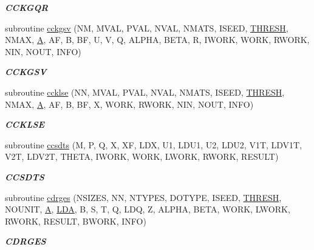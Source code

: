 \begin{DoxyCompactItemize}
\begin{DoxyCompactList}\small\item\em {\bfseries C\+C\+K\+G\+Q\+R} \end{DoxyCompactList}\item 
subroutine \hyperlink{group__complex__eig_gab332c713db9ff9a65c6b4ee66173021c}{cckgsv} (N\+M, M\+V\+A\+L, P\+V\+A\+L, N\+V\+A\+L, N\+M\+A\+T\+S, I\+S\+E\+E\+D, \hyperlink{zlaqgs_8c_a0656018abfc9fa2821827415f5d5ea57}{T\+H\+R\+E\+S\+H}, N\+M\+A\+X, \hyperlink{classA}{A}, A\+F, B, B\+F, U, V, Q, A\+L\+P\+H\+A, B\+E\+T\+A, R, I\+W\+O\+R\+K, W\+O\+R\+K, R\+W\+O\+R\+K, N\+I\+N, N\+O\+U\+T, I\+N\+F\+O)
\begin{DoxyCompactList}\small\item\em {\bfseries C\+C\+K\+G\+S\+V} \end{DoxyCompactList}\item 
subroutine \hyperlink{group__complex__eig_ga5b0a12a9548976fc736b24a730538084}{ccklse} (N\+N, M\+V\+A\+L, P\+V\+A\+L, N\+V\+A\+L, N\+M\+A\+T\+S, I\+S\+E\+E\+D, \hyperlink{zlaqgs_8c_a0656018abfc9fa2821827415f5d5ea57}{T\+H\+R\+E\+S\+H}, N\+M\+A\+X, \hyperlink{classA}{A}, A\+F, B, B\+F, X, W\+O\+R\+K, R\+W\+O\+R\+K, N\+I\+N, N\+O\+U\+T, I\+N\+F\+O)
\begin{DoxyCompactList}\small\item\em {\bfseries C\+C\+K\+L\+S\+E} \end{DoxyCompactList}\item 
subroutine \hyperlink{group__complex__eig_gafa5cdc631c988f7e170b0829ef5e1b08}{ccsdts} (M, P, Q, X, X\+F, L\+D\+X, U1, L\+D\+U1, U2, L\+D\+U2, V1\+T, L\+D\+V1\+T, V2\+T, L\+D\+V2\+T, T\+H\+E\+T\+A, I\+W\+O\+R\+K, W\+O\+R\+K, L\+W\+O\+R\+K, R\+W\+O\+R\+K, R\+E\+S\+U\+L\+T)
\begin{DoxyCompactList}\small\item\em {\bfseries C\+C\+S\+D\+T\+S} \end{DoxyCompactList}\item 
subroutine \hyperlink{group__complex__eig_ga9768e84ddc8b8b97e11717e35c5269fe}{cdrges} (N\+S\+I\+Z\+E\+S, N\+N, N\+T\+Y\+P\+E\+S, D\+O\+T\+Y\+P\+E, I\+S\+E\+E\+D, \hyperlink{zlaqgs_8c_a0656018abfc9fa2821827415f5d5ea57}{T\+H\+R\+E\+S\+H}, N\+O\+U\+N\+I\+T, \hyperlink{classA}{A}, \hyperlink{example__user_8c_ae946da542ce0db94dced19b2ecefd1aa}{L\+D\+A}, B, S, T, Q, L\+D\+Q, Z, A\+L\+P\+H\+A, B\+E\+T\+A, W\+O\+R\+K, L\+W\+O\+R\+K, R\+W\+O\+R\+K, R\+E\+S\+U\+L\+T, B\+W\+O\+R\+K, I\+N\+F\+O)
\begin{DoxyCompactList}\small\item\em {\bfseries C\+D\+R\+G\+E\+S} \end{DoxyCompactList}\item 

\end{DoxyCompactItemize}
